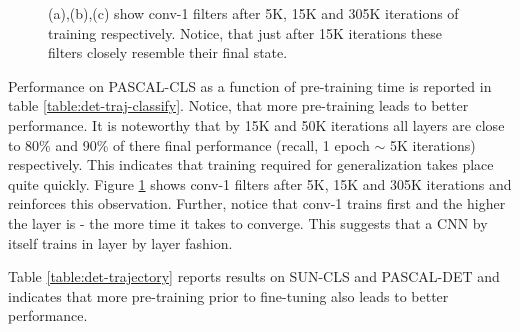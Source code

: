 \begin{figure}[t!]
\caption{(a),(b),(c) show conv-1 filters after 5K, 15K and 305K iterations of training respectively. Notice, that just after 15K iterations these filters closely resemble their final state.}

\label{fig:conv1}
\end{figure}

Performance on PASCAL-CLS as a function of pre-training time is reported in table \ref{table:det-traj-classify}. Notice, that more pre-training leads to better performance. It is noteworthy that by 15K and 50K iterations all layers are close to 80\% and  90\% of there final performance (recall, 1 epoch $\sim$ 5K iterations) respectively. This indicates that training required for generalization takes place quite quickly. Figure \ref{fig:conv1} shows conv-1 filters after 5K, 15K and 305K iterations and reinforces this observation. Further, notice that conv-1 trains first and the higher the layer is -  the more time it takes to converge. This suggests that a CNN by itself trains in layer by layer fashion.   

Table \ref{table:det-trajectory} reports results on SUN-CLS and PASCAL-DET and indicates that more pre-training prior to fine-tuning also leads to better performance.  



